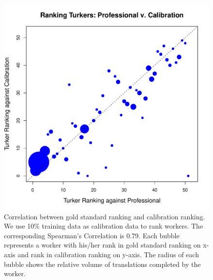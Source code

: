 \documentclass[11pt]{article}
\begin{document}
\begin{figure}[h!]
  \centering
  \includegraphics[width=\linewidth]{OnlyCali/calirankingorder.pdf}
  \caption{Correlation between gold standard ranking and calibration ranking. We use 10\% training data as calibration data to rank workers. The corresponding Spearman's Correlation is 0.79. Each bubble represents a worker with his/her rank in gold standard ranking on x-axis and rank in calibration ranking on y-axis. The radius of each bubble shows the relative volume of translations completed by the worker.  }
    \label{fdtallwocalbutbilinorder}
\end{figure}
\end{document}

